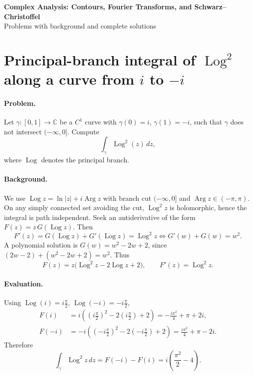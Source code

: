 \documentclass[11pt]{article}
\DeclareMathOperator{\Log}{Log}
\DeclareMathOperator{\Arg}{Arg}
\begin{document}
	
	\begin{center}
		{\Large\bf Complex Analysis: Contours, Fourier Transforms, and Schwarz--Christoffel}\\[0.45em]
		{\small Problems with background and complete solutions}
	\end{center}
	
	\bigskip
	
	\section*{Principal-branch integral of $\Log^2$ along a curve from $i$ to $-i$}
	
	\paragraph{Problem.}
	Let $\gamma:[0,1]\to\mathbb C$ be a $C^1$ curve with $\gamma(0)=i$, $\gamma(1)=-i$,
	such that $\gamma$ does not intersect $(-\infty,0]$. Compute
	\[
	\int_{\gamma}\Log^2(z)\,dz,
	\]
	where $\Log$ denotes the principal branch.
	
	\paragraph{Background.}
	We use $\Log z=\ln|z|+i\Arg z$ with branch cut $(-\infty,0]$ and $\Arg z\in(-\pi,\pi)$.
	On any simply connected set avoiding the cut, $\Log^2 z$ is holomorphic, hence the integral
	is path independent. Seek an antiderivative of the form $F(z)=z\,G(\Log z)$. Then
	\[
	F'(z)=G(\Log z)+G'(\Log z)=\Log^2 z
	\iff
	G'(w)+G(w)=w^2.
	\]
	A polynomial solution is $G(w)=w^2-2w+2$, since $(2w-2)+(w^2-2w+2)=w^2$.
	Thus
	\[
	F(z)=z\big(\Log^2 z-2\Log z+2\big),\qquad F'(z)=\Log^2 z.
	\]
	
	\paragraph{Evaluation.}
	Using $\Log(i)=i\frac{\pi}{2}$, $\Log(-i)=-i\frac{\pi}{2}$,
	\[
	\begin{aligned}
		F(i)&=i\!\left(\left(i\frac{\pi}{2}\right)^{2}-2\left(i\frac{\pi}{2}\right)+2\right)
		=-\frac{i\pi^{2}}{4}+\pi+2i,\\[2mm]
		F(-i)&=-i\!\left(\left(-i\frac{\pi}{2}\right)^{2}-2\left(-i\frac{\pi}{2}\right)+2\right)
		=\frac{i\pi^{2}}{4}+\pi-2i.
	\end{aligned}
	\]
	Therefore
	\[
	\boxed{\ \displaystyle \int_{\gamma}\Log^{2}z\,dz
		=F(-i)-F(i)= i\!\left(\frac{\pi^{2}}{2}-4\right). \ }
	\]
	
\end{document}
